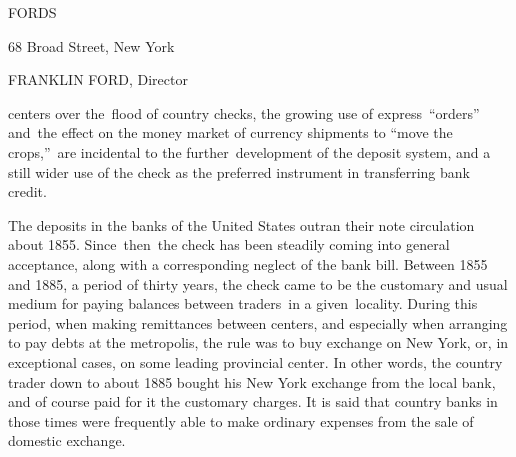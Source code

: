 \documentclass[openany,nobib]{tufte-book}
\begin{document}
\vspace{.2in}

\begin{LARGE}


\end{LARGE}

\vspace{0.5in}

\begin{center}
    

{\huge FORDS}

\vspace{0.2in}

{\LARGE 68 Broad Street, New York}

\vspace{0.2in}

{\large FRANKLIN FORD, Director}

\end{center}


\vspace{.35in}


\vspace{.01in}
\hspace{0.25in}{\bfseries\Large No. 2}

\vspace{0.2in}


 centers over the~flood of country checks, the
growing use of express~``orders''~ and~the effect on the money market of
currency shipments to ``move the crops,''~are incidental to the
further~development of the deposit system, and a still wider use of the
check as the preferred instrument in transferring bank credit.~

The deposits in the banks of the United States outran their note
circulation about 1855. Since~then~the check has been steadily coming
into general acceptance, along with a corresponding neglect of the bank
bill. Between 1855 and 1885, a period of thirty years, the check came to
be the customary and usual medium for paying balances between traders~in
a given~locality. During this period, when making remittances between
centers, and especially when arranging to pay debts at the metropolis,
the rule was to buy exchange on New York, or, in exceptional cases, on
some leading provincial center. In other words, the country trader down
to about 1885 bought his New York exchange from the local bank, and of
course paid for it the customary charges. It is said that country banks
in those times were frequently able to make ordinary expenses from the
sale of domestic exchange. ~
\end{document}

